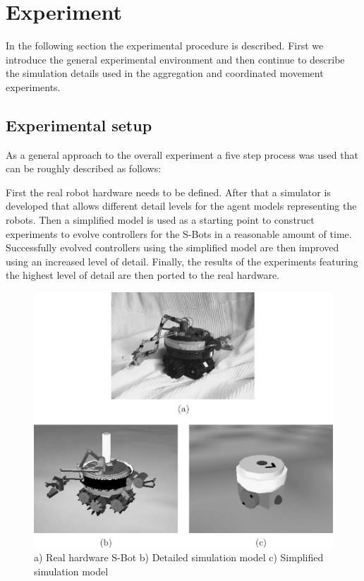 
%
%

\section{Experiment}
In the following section the experimental procedure is described. First we
introduce the general experimental environment and then continue to describe
the simulation details used in the aggregation and coordinated movement
experiments.

\subsection{Experimental setup}
As a general approach to the overall experiment a five step process was used
that can be roughly described as follows:

First the real robot hardware needs to be defined. After that a simulator is
developed that allows different detail levels for the agent models
representing the robots. Then a simplified model is used as a starting point
to construct experiments to evolve controllers for the S-Bots in a
reasonable amount of time. Successfully evolved controllers using the
simplified model are then improved using an increased level of detail.
Finally, the results of the experiments featuring the highest level of detail
are then ported to the real hardware.
\ \\
\begin{figure}[h]
  \centering
    \includegraphics[width=0.8\linewidth]{pics/01.jpg}
  \caption{a) Real hardware S-Bot b) Detailed simulation model c) Simplified
           simulation model}
  \label{}
\end{figure}


